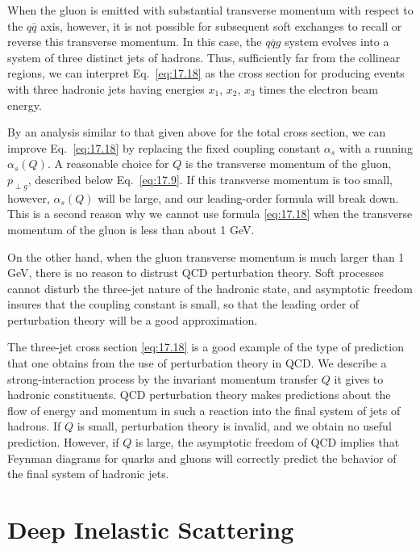 When the gluon is emitted with substantial transverse momentum with respect
to the $q\bar{q}$ axis, however, it is not possible for subsequent soft
exchanges to recall or reverse this transverse momentum.  In this case, the
$q\bar{q}g$ system evolves into a system of three distinct jets of hadrons.
Thus, sufficiently far from the collinear regions, we can interpret
Eq.~\eqref{eq:17.18} as the cross section for producing events with three
hadronic jets having energies $x_1$, $x_2$, $x_3$ times the electron beam
energy.

By an analysis similar to that given above for the total cross section, we
can improve Eq.~\eqref{eq:17.18} by replacing the fixed coupling constant
$\alpha_s$ with a running $\alpha_s(Q)$.  A reasonable choice for $Q$ is the
transverse momentum of the gluon, $p_{\perp g}$, described below
Eq.~\eqref{eq:17.9}.  If this transverse momentum is too small, however,
$\alpha_s(Q)$ will be large, and our leading-order formula will break down.
This is a second reason why we cannot use formula \eqref{eq:17.18} when the
transverse momentum of the gluon is less than about 1 GeV.

On the other hand, when the gluon transverse momentum is much larger than
1 GeV, there is no reason to distrust QCD perturbation theory.  Soft processes
cannot disturb the three-jet nature of the hadronic state, and asymptotic
freedom insures that the coupling constant is small, so that the leading
order of perturbation theory will be a good approximation.

The three-jet cross section \eqref{eq:17.18} is a good example of the type of
prediction that one obtains from the use of perturbation theory in QCD.  We
describe a strong-interaction process by the invariant momentum transfer $Q$
it gives to hadronic constituents.  QCD perturbation theory makes predictions
about the flow of energy and momentum in such a reaction into the final
system of jets of hadrons.  If $Q$ is small, perturbation theory is invalid,
and we obtain no useful prediction.  However, if $Q$ is large, the asymptotic
freedom of QCD implies that Feynman diagrams for quarks and gluons will
correctly predict the behavior of the final system of hadronic jets.

\section{Deep Inelastic Scattering}

